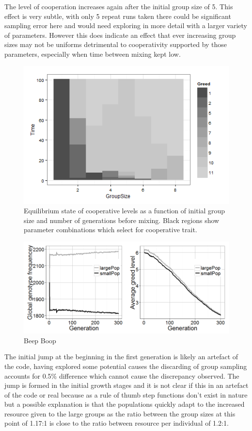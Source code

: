 \documentclass[a4paper,10pt, twocolumn]{article}
\begin{document}
The level of cooperation increases again after the initial group size of 5. This effect is very subtle, with only 5 repeat runs taken there could be significant sampling error here and would need exploring in more detail with a larger variety of parameters. However this does indicate an effect that ever increasing group sizes may not be uniforms detrimental to cooperativity supported by those parameters, especially when time between mixing kept low.

\begin{figure}[ht]
	\includegraphics[width=0.9\linewidth]{extensionEquilibriumPlot.png}
	\centering
	\caption{Equilibrium state of cooperative levels as a function of initial group size and number of generations before mixing. Black regions show parameter combinations which select for cooperative trait.}
		\label{fig:extensionFig2}
\end{figure}


\begin{figure}[ht]
	\includegraphics[width=0.9\linewidth]{extenstionFigure1.png}
	\centering
	\caption{Beep Boop}
		\label{fig:extensionFig1}
\end{figure}

The initial jump at the beginning in the first generation is likely an artefact of the code, having explored some potential causes the discarding of group sampling accounts for 0.5\% difference which cannot cause the discrepancy observed. The jump is formed in the initial growth stages and it is not clear if this in an artefact of the code or real because as a rule of thumb step functions don't exist in nature but a possible explanation is that the populations quickly adapt to the increased resource given to the large groups as the ratio between the group sizes at this point of 1.17:1 is close to the ratio between resource per individual of 1.2:1. 
\end{document}
